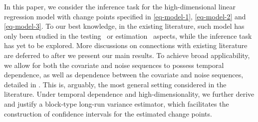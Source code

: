 \documentclass[11pt]{article}
\theoremstyle{plain}
\theoremstyle{definition}
\begin{document}
In this paper, we consider the inference task for the high-dimensional linear regression model with change points specified in \eqref{eq-model-1}, \eqref{eq-model-2} and \eqref{eq-model-3}.  To our best knowledge, in the existing literature, such model has only been studied in the testing~\citep[e.g.][]{wang2022optimal} or estimation~\citep[e.g.][]{lee2016lasso, kaul2019efficient, wang2021statistically} aspects, while the inference task has yet to be explored.  More discussions on connections with existing literature are deferred to  after we present our main results.  To achieve broad applicability, we allow for both the covariate and noise sequences to possess temporal dependence, as well as dependence between the covariate and noise sequences, detailed in . This is, arguably, the most general setting considered in the literature. Under temporal dependence and high-dimensionality, we further derive and justify a block-type long-run variance estimator, which facilitates the construction of confidence intervals for the estimated change points.
\end{document}
